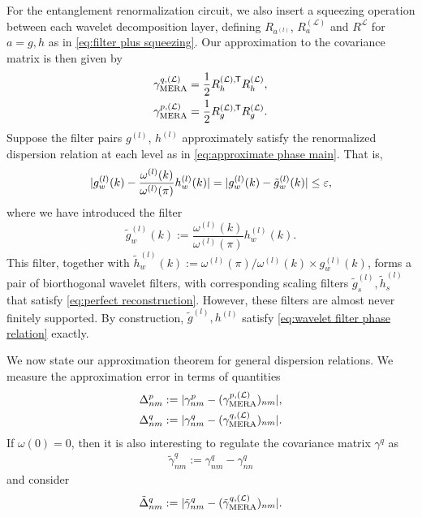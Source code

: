 \documentclass[submission, Phys]{SciPost}
\theoremstyle{definition}
\theoremstyle{remark}
\DeclareMathOperator{\mera}{MERA}
\DeclarePairedDelimiter{\abs}{\lvert}{\rvert}
\newcommand{\eps}{\varepsilon}
\newcommand{\cL}{\mathcal L}
\newcommand*{\tran}{{\mkern-1.5mu\mathsf{T}}}
\begin{document}
\begin{appendix}
For the entanglement renormalization circuit, we also insert a squeezing operation between each wavelet decomposition layer, defining $R_{a^{(l)}}$, $R_a^{(\cL)}$ and $R^{\cL}$ for $a = g, h$ as in \cref{eq:filter plus squeezing}.
Our approximation to the covariance matrix is then given by
\begin{equation}\begin{aligned}\label{eq:mera covariance matrices}
  \gamma^{q,(\cL)}_{\mera} &= \frac12 R_h^{(\cL),\tran}R_h^{(\cL)}, \\
  \gamma^{p,(\cL)}_{\mera} &= \frac12 R_g^{(\cL),\tran}R_g^{(\cL)}.
\end{aligned}\end{equation}
Suppose the filter pairs $g^{(l)}$, $h^{(l)}$ approximately satisfy the renormalized dispersion relation at each level as in \cref{eq:approximate phase main}.
That is,
\begin{equation}\label{eq:approximate phase supp}
  \abs{g^{(l)}_w(k) - \frac {\omega^{(l)}(k)}{\omega^{(l)}(\pi)} h^{(l)}_w(k) } =
\abs{ g^{(l)}_w(k) - \tilde{g}^{(l)}_w(k) }
\leq \eps,
\end{equation}
where we have introduced the filter
\begin{equation}\label{eq:filter tilde}
  \tilde{g}^{(l)}_w(k) := \frac{\omega^{(l)}(k)}{\omega^{(l)}(\pi)} h^{(l)}_w(k).
\end{equation}
This filter, together with $\tilde{h}^{(l)}_w(k) := \omega^{(l)}(\pi) / \omega^{(l)}(k) \times g^{(l)}_w(k)$, forms a pair of biorthogonal wavelet filters, with corresponding scaling filters $\tilde g^{(l)}_s, \tilde h^{(l)}_s$ that satisfy \cref{eq:perfect reconstruction}.
However, these filters are almost never finitely supported.
By construction, $\tilde{g}^{(l)}, h^{(l)}$ satisfy \cref{eq:wavelet filter phase relation} exactly.

We now state our approximation theorem for general dispersion relations.
We measure the approximation error in terms of quantities
\begin{equation}\begin{aligned}\label{eq:define delta}
  \Delta^p_{nm} := \abs{\gamma^p_{nm} - (\gamma^{p,(\cL)}_{\mera})_{nm}}, \\
  \Delta^q_{nm} := \abs{\gamma^q_{nm} - (\gamma^{q,(\cL)}_{\mera})_{nm}}.
\end{aligned}\end{equation}
If $\omega(0) = 0$, then it is also interesting to regulate the covariance matrix $\gamma^q$ as
\begin{align}\label{eq:regulated cov}
  \tilde{\gamma}^q_{nm} := \gamma^q_{nm} - \gamma^q_{nn}
\end{align}
and consider
\begin{equation}\label{eq:define delta tilde}
  \tilde\Delta^q_{nm} := \abs{\tilde{\gamma}^q_{nm} - (\tilde{\gamma}^{q,(\cL)}_{\mera})_{nm}}.
\end{equation}


\end{appendix}
\end{document}
